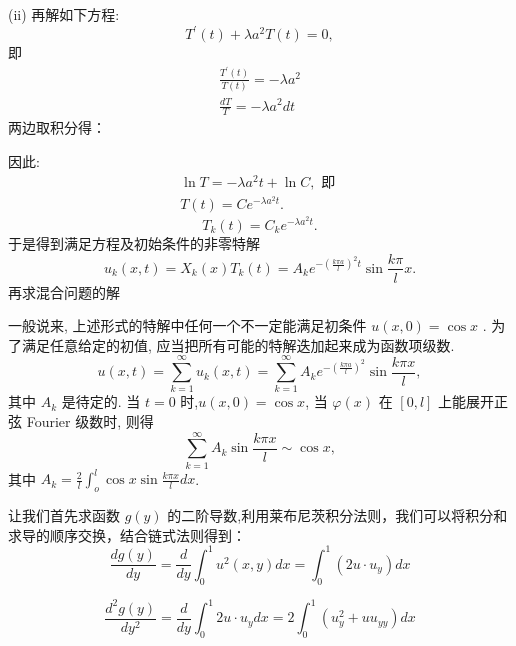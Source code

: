 \begin{questions}
\begin{solution}
(ii) 再解如下方程:
$$
T^{\prime}(t)+\lambda a^{2} T(t)=0,
$$
即
$$
\begin{array}{l}
\frac{T^{\prime}(t)}{T(t)}=-\lambda a^{2} \\
\frac{d T}{T}=-\lambda a^{2} d t
\end{array}
$$
两边取积分得：

因此:
$$
\begin{array}{c}
\ln T=-\lambda a^{2} t+\ln C, \text { 即 } \\
T(t)=C e^{-\lambda a^{2} t} .
\end{array}
$$
$$
T_{k}(t)=C_{k} e^{-\lambda a^{2} t} .
$$
于是得到满足方程及初始条件的非零特解
$$
u_{k}(x, t)=X_{k}(x) T_{k}(t)=A_{k} e^{-\left(\frac{k \pi a}{l}\right)^{2} t} \sin \frac{k \pi}{l} x .
$$
再求混合问题的解

一般说来, 上述形式的特解中任何一个不一定能满足初条件 $u(x, 0)=\cos x$ . 为了满足任意给定的初值, 应当把所有可能的特解迭加起来成为函数项级数.
$$
u(x, t)=\sum_{k=1}^{\infty} u_{k}(x, t)=\sum_{k=1}^{\infty} A_{k} e^{-\left(\frac{k \pi a}{l}\right)^{2}} \sin \frac{k \pi x}{l},
$$
其中 $ A_{k} $ 是待定的.
当 $ t=0 $ 时,$ u(x, 0)=\cos x $,
当 $ \varphi(x) $ 在 $ [0, l] $ 上能展开正弦 Fourier 级数时, 则得
$$
\sum_{k=1}^{\infty} A_{k} \sin \frac{k \pi x}{l} \sim \cos x ,
$$
其中 $ A_{k}=\frac{2}{l} \int_{o}^{l} \cos x  \sin \frac{k \pi x}{l} d x $.
\end{solution}
\begin{solution}
    让我们首先求函数 $g(y)$ 的二阶导数,利用莱布尼茨积分法则，我们可以将积分和求导的顺序交换，结合链式法则得到：
$$\frac{d g(y)}{d y}=\frac{d}{d y} \int_{0}^{1} u^{2}(x, y) d x=\int_{0}^{1}( 2 u \cdot u_{y}) d x $$

$$\frac{d^{2} g(y)}{d y^{2}}=\frac{d}{d y} \int_{0}^{1} 2 u \cdot u_{y} d x=2 \int_{0}^{1} (u_{y}^{2}+u u_{y y} )dx$$



\end{solution}
\end{questions}
